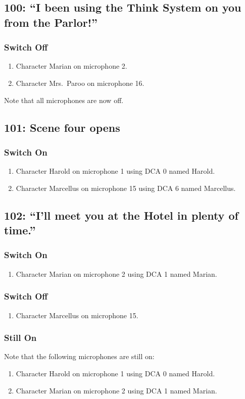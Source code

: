\subsection* {100: ``I been using the Think System on you from the Parlor!''}
\subsubsection* {Switch Off}
\begin{enumerate}
\item Character Marian on microphone 2.
\item Character Mrs.~Paroo on microphone 16.
\end{enumerate}
Note that all microphones are now off.
\subsection* {101: Scene four opens}
\subsubsection* {Switch On}
\begin{enumerate}
\item Character Harold on microphone 1 using DCA 0 named Harold.
\item Character Marcellus on microphone 15 using DCA 6 named Marcellus.
\end{enumerate}
\subsection* {102: ``I'll meet you at the Hotel in plenty of time.''}
\subsubsection* {Switch On}
\begin{enumerate}
\item Character Marian on microphone 2 using DCA 1 named Marian.
\end{enumerate}
\subsubsection* {Switch Off}
\begin{enumerate}
\item Character Marcellus on microphone 15.
\end{enumerate}
\subsubsection* {Still On}
Note that the following microphones are still on:
\begin{enumerate}
\item Character Harold on microphone 1 using DCA 0 named Harold.
\item Character Marian on microphone 2 using DCA 1 named Marian.
\end{enumerate}
